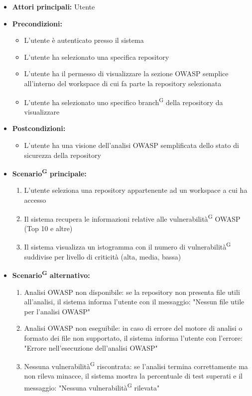 \documentclass[a4paper, 11pt]{article}
\begin{document}
\begin{itemize}
	\item \textbf{Attori principali:} Utente
	\item \textbf{Precondizioni:} 
    \begin{itemize}
        \item L'utente è autenticato presso il sistema
        \item L’utente ha selezionato una specifica repository
        \item L’utente ha il permesso di visualizzare la sezione OWASP semplice all’interno del workspace di cui fa parte la repository selezionata
        \item L’utente ha selezionato uno specifico branch\textsuperscript{G} della repository da visualizzare
    \end{itemize}
	\item \textbf{Postcondizioni:} 
    \begin{itemize}
    \item L’utente ha una visione dell’analisi OWASP semplificata dello stato di sicurezza della repository
    \end{itemize}
	\item \textbf{Scenario\textsuperscript{G} principale:}
	\begin{enumerate}
		\item L’utente seleziona una repository appartenente ad un workspace a cui ha accesso
		\item Il sistema recupera le informazioni relative alle vulnerabilità\textsuperscript{G} OWASP (Top 10 e altre)
        \item Il sistema visualizza un istogramma con il numero di vulnerabilità\textsuperscript{G} suddivise per livello di criticità (alta, media, bassa)
	\end{enumerate}
    \item \textbf{Scenario\textsuperscript{G} alternativo:}
	\begin{enumerate}
		\item Analisi OWASP non disponibile: se la repository non presenta file utili all'analisi, il sistema informa l'utente con il messaggio: "Nessun file utile per l'analisi OWASP"
		\item Analisi OWASP non eseguibile: in caso di errore del motore di analisi o formato dei file non supportato, il sistema informa l'utente con l'errore: "Errore nell'esecuzione dell'analisi OWASP"
		\item Nessuna vulnerabilità\textsuperscript{G} riscontrata: se l'analisi termina correttamente ma non rileva minacce, il sistema mostra la percentuale di test superati e il messaggio: "Nessuna vulnerabilità\textsuperscript{G} rilevata"   
	\end{enumerate}
\end{itemize}
\end{document}
